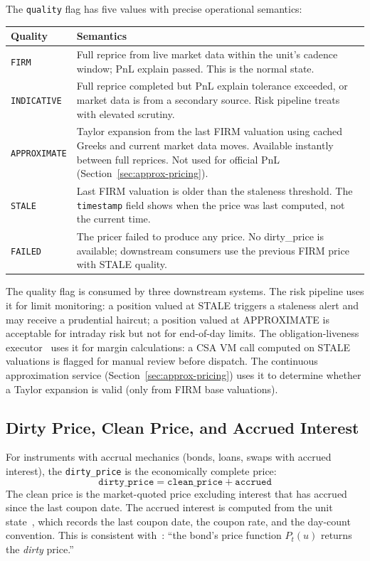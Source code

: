 \documentclass[11pt,a4paper]{article}
\begin{document}
The \texttt{quality} flag has five values with precise operational semantics:

\begin{center}
\small
\begin{tabular}{l p{9cm}}
\toprule
\textbf{Quality} & \textbf{Semantics} \\
\midrule
\texttt{FIRM} & Full reprice from live market data within the unit's cadence window; PnL explain passed.  This is the normal state. \\
\texttt{INDICATIVE} & Full reprice completed but PnL explain tolerance exceeded, or market data is from a secondary source.  Risk pipeline treats with elevated scrutiny. \\
\texttt{APPROXIMATE} & Taylor expansion from the last FIRM valuation using cached Greeks and current market data moves.  Available instantly between full reprices.  Not used for official PnL (Section~\ref{sec:approx-pricing}). \\
\texttt{STALE} & Last FIRM valuation is older than the staleness threshold.  The \texttt{timestamp} field shows when the price was last computed, not the current time. \\
\texttt{FAILED} & The pricer failed to produce any price.  No dirty\_price is available; downstream consumers use the previous FIRM price with STALE quality. \\
\bottomrule
\end{tabular}
\end{center}

\noindent The quality flag is consumed by three downstream systems.  The risk pipeline uses it for limit monitoring: a position valued at STALE triggers a staleness alert and may receive a prudential haircut; a position valued at APPROXIMATE is acceptable for intraday risk but not for end-of-day limits.  The obligation-liveness executor~\cite[\S14.7]{ledger} uses it for margin calculations: a CSA VM call computed on STALE valuations is flagged for manual review before dispatch.  The continuous approximation service (Section~\ref{sec:approx-pricing}) uses it to determine whether a Taylor expansion is valid (only from FIRM base valuations).

\subsection{Dirty Price, Clean Price, and Accrued Interest}

For instruments with accrual mechanics (bonds, loans, swaps with accrued interest), the \texttt{dirty\_price} is the economically complete price:
\[
\texttt{dirty\_price} = \texttt{clean\_price} + \texttt{accrued}
\]
The clean price is the market-quoted price excluding interest that has accrued since the last coupon date.  The accrued interest is computed from the unit state~\cite[\S7]{ledger}, which records the last coupon date, the coupon rate, and the day-count convention.  This is consistent with~\cite[\S5.3]{ledger}: ``the bond's price function $P_t(u)$ returns the \emph{dirty} price.''
\end{document}
